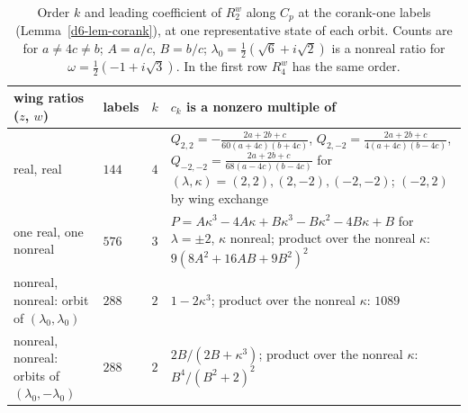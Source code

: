 \documentclass[Threeside,11pt]{article}
\theoremstyle{definition}
\theoremstyle{remark}
\numberwithin{equation}{section}
\theoremstyle{remark}
\begin{document}
\begin{table}[ht]
\centering
\small
\begin{tabular}{p{3.3cm}p{0.9cm}p{0.3cm}p{6.6cm}}
\hline
wing ratios ($z$, $w$) & labels & $k$ & $c_k$ is a nonzero multiple of \\
\hline
real, real & $144$ & $4$ &
$Q_{2,2}=-\frac{2a+2b+c}{60(a+4c)(b+4c)}$, $Q_{2,-2}=\frac{2a+2b+c}{4(a+4c)(b-4c)}$,
$Q_{-2,-2}=\frac{2a+2b+c}{68(a-4c)(b-4c)}$ for $(\lambda,\kappa)=(2,2),(2,-2),(-2,-2)$;
$(-2,2)$ by wing exchange \\
one real, one nonreal & $576$ & $3$ &
$P=A\kappa^3-4A\kappa+B\kappa^3-B\kappa^2-4B\kappa+B$ for $\lambda=\pm2$, $\kappa$ nonreal;
product over the nonreal $\kappa$: $9(8A^2+16AB+9B^2)^2$ \\
nonreal, nonreal: orbit of $(\lambda_0,\lambda_0)$ & $288$ & $2$ &
$1-2\kappa^3$; product over the nonreal $\kappa$: $1089$ \\
nonreal, nonreal: orbits of $(\lambda_0,-\lambda_0)$ & $288$ & $2$ &
$2B/(2B+\kappa^3)$; product over the nonreal $\kappa$: $B^4/(B^2+2)^2$ \\
\hline
\end{tabular}
\caption{Order $k$ and leading coefficient of $R^w_2$ along $C_p$ at the corank-one labels
(Lemma~\ref{d6-lem-corank}), at one representative state of each orbit.  Counts are for
$a\ne4c\ne b$; $A=a/c$, $B=b/c$; $\lambda_0=\frac12(\sqrt6+i\sqrt2)$ is a nonreal ratio for
$\omega=\frac12(-1+i\sqrt3)$.  In the first row $R^w_4$ has the same order.}\label{d6-tab-corank}
\end{table}
\end{document}
